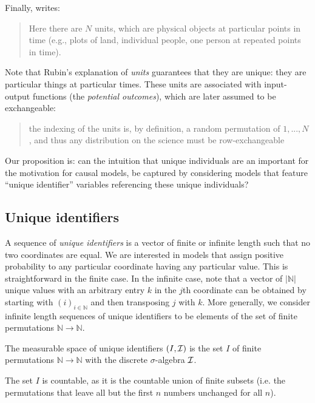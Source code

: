 Finally, \citet{rubin_causal_2005} writes:
\begin{quote}
    Here there are $N$ units, which are physical objects at particular points in time (e.g., plots of land, individual people, one person at repeated points in time).
\end{quote}
Note that Rubin's explanation of \emph{units} guarantees that they are unique: they are particular things at particular times. These units are associated with input-output functions (the \emph{potential outcomes}), which are later assumed to be exchangeable:
\begin{quote}
    the indexing of the units is, by definition, a random permutation of $1,..., N$, and thus any distribution on the science must be row-exchangeable
\end{quote}

Our proposition is: can the intuition that unique individuals are an important for the motivation for causal models, be captured by considering models that feature ``unique identifier'' variables referencing these unique individuals?

\subsection{Unique identifiers}

A sequence of \emph{unique identifiers} is a vector of finite or infinite length such that no two coordinates are equal. We are interested in models that assign positive probability to any particular coordinate having any particular value. This is straightforward in the finite case. In the infinite case, note that a vector of $|\mathbb{N}|$ unique values with an arbitrary entry $k$ in the $j$th coordinate can be obtained by starting with $(i)_{i\in \mathbb{N}}$ and then transposing $j$ with $k$. More generally, we consider infinite length sequences of unique identifiers to be elements of the set of finite permutations $\mathbb{N}\to\mathbb{N}$.

\begin{definition}
The measurable space of unique identifiers $(I,\mathcal{I})$ is the set $I$ of finite permutations $\mathbb{N}\to \mathbb{N}$ with the discrete $\sigma$-algebra $\mathcal{I}$.
\end{definition}

The set $I$ is countable, as it is the countable union of finite subsets (i.e. the permutations that leave all but the first $n$ numbers unchanged for all $n$).

